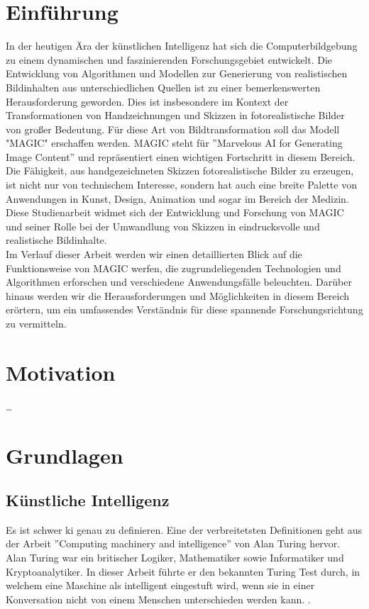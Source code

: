 \documentclass[12pt,a4paper]{article}
\begin{document}
\section{Einführung}
	In der heutigen Ära der künstlichen Intelligenz hat sich die Computerbildgebung zu einem dynamischen und faszinierenden Forschungsgebiet entwickelt. 
	Die Entwicklung von Algorithmen und Modellen zur Generierung von realistischen Bildinhalten aus unterschiedlichen Quellen ist zu einer bemerkenswerten Herausforderung geworden. 
	Dies ist insbesondere im Kontext der Transformationen von Handzeichnungen und Skizzen in fotorealistische Bilder von großer Bedeutung.
	Für diese Art von Bildtransformation soll das Modell "MAGIC" erschaffen werden.
	MAGIC steht für ''Marvelous AI for Generating Image Content'' und repräsentiert einen wichtigen Fortschritt in diesem Bereich.\\
	Die Fähigkeit, aus handgezeichneten Skizzen fotorealistische Bilder zu erzeugen, ist nicht nur von technischem Interesse, sondern hat auch eine breite Palette von Anwendungen in Kunst, Design, Animation und sogar im Bereich der Medizin. 
	Diese Studienarbeit widmet sich der Entwicklung und Forschung von MAGIC und seiner Rolle bei der Umwandlung von Skizzen in eindrucksvolle und realistische Bildinhalte.\\
	Im Verlauf dieser Arbeit werden wir einen detaillierten Blick auf die Funktionsweise von MAGIC werfen, die zugrundeliegenden Technologien und Algorithmen erforschen und verschiedene Anwendungsfälle beleuchten. 
	Darüber hinaus werden wir die Herausforderungen und Möglichkeiten in diesem Bereich erörtern, um ein umfassendes Verständnis für diese spannende Forschungsrichtung zu vermitteln.
	
\newpage
\section{Motivation}
\dots

\newpage
\section{Grundlagen}
	\subsection{Künstliche Intelligenz}
		Es ist schwer \ac{ki} genau zu definieren.
		Eine der verbreitetsten Definitionen geht aus der Arbeit ''Computing machinery and intelligence'' von Alan Turing hervor.
		Alan Turing war ein britischer Logiker, Mathematiker sowie Informatiker und Kryptoanalytiker. 
		In dieser Arbeit führte er den bekannten Turing Test durch, in welchem eine Maschine als intelligent eingestuft wird, wenn sie in einer Konversation nicht von einem Menschen unterschieden werden kann.
		\cite[\ac{vgl}][]{10.1111/bjd.18880}.
\end{document}
